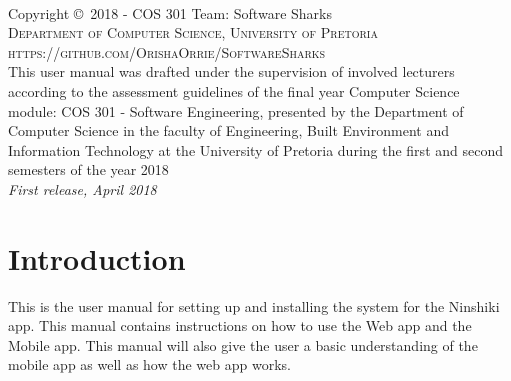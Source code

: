 \documentclass[a4paper, 12pt]{article}
\begin{document}
\pagebreak


\newpage
~\vfill
\thispagestyle{empty}

\noindent Copyright \copyright\ 2018 - COS 301 Team: Software Sharks\\ %

\noindent \textsc{Department of Computer Science, University of Pretoria}\\

\noindent \textsc{https://github.com/OrishaOrrie/SoftwareSharks}\\ %

\noindent This user manual was drafted under the supervision of involved lecturers according to the assessment guidelines of the final year Computer Science module: COS 301 - Software Engineering, presented by the Department of Computer Science in the faculty of Engineering, Built Environment and Information Technology at the University of Pretoria during the first and second semesters of the year 2018 \\ %

\noindent \textit{First release, April 2018} %

\pagebreak

\tableofcontents

\pagebreak

\section{Introduction}
This is the user manual for setting up and installing the system for the Ninshiki app. This manual contains instructions on how to use the Web app and the Mobile app. This manual will also give the user a basic understanding of the mobile app as well as how the web app works.
\end{document}
